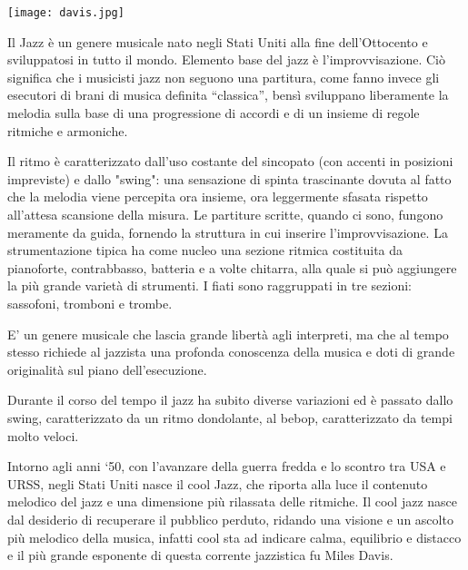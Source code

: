 \noindent
\texttt{[image: davis.jpg]}

Il Jazz è un genere musicale nato negli Stati Uniti alla fine dell'Ottocento e sviluppatosi in tutto il mondo. Elemento base del jazz è l’improvvisazione. Ciò significa che i musicisti jazz non seguono una partitura, come fanno invece gli esecutori di brani di musica definita “classica”, bensì sviluppano liberamente la melodia sulla base di una progressione di accordi e di un insieme di regole ritmiche e armoniche.

Il ritmo è caratterizzato dall'uso costante del sincopato (con accenti in posizioni impreviste) e dallo "swing": una sensazione di spinta trascinante dovuta al fatto che la melodia viene percepita ora insieme, ora leggermente sfasata rispetto all'attesa scansione della misura. Le partiture scritte, quando ci sono, fungono meramente da guida, fornendo la struttura in cui inserire l'improvvisazione.
La strumentazione tipica ha come nucleo una sezione ritmica costituita da pianoforte, contrabbasso, batteria e a volte chitarra, alla quale si può aggiungere la più grande varietà di strumenti. I fiati sono raggruppati in tre sezioni: sassofoni, tromboni e trombe.

E’ un genere musicale che lascia grande libertà agli interpreti, ma che al tempo stesso richiede al jazzista una profonda conoscenza della musica e doti di grande originalità sul piano dell’esecuzione.

Durante il corso del tempo il jazz ha subito diverse variazioni ed è passato dallo swing, caratterizzato da un ritmo dondolante, al bebop, caratterizzato da tempi molto veloci.

Intorno agli anni ‘50, con l’avanzare della guerra fredda e lo scontro tra USA e URSS, negli Stati  Uniti nasce il cool Jazz, che riporta alla luce il contenuto melodico del jazz e una dimensione più rilassata delle ritmiche. Il cool jazz nasce dal desiderio di recuperare il pubblico perduto, ridando una visione e un ascolto più melodico della musica, infatti cool sta ad indicare calma, equilibrio e distacco e il più grande esponente di questa corrente jazzistica fu Miles Davis.

